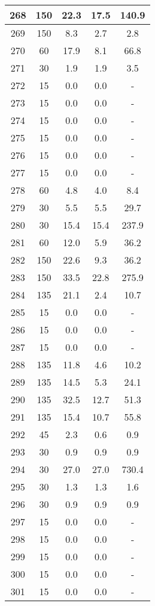 \documentclass[a4paper,10pt]{article}
\begin{document}
\begin{table}
\begin{tabular}{|c|c|c|c|c|}
\hline
268 & 150 & 22.3 & 17.5 & 140.9 \\
\hline
269 & 150 & 8.3 & 2.7 & 2.8 \\
\hline
270 & 60 & 17.9 & 8.1 & 66.8 \\
\hline
271 & 30 & 1.9 & 1.9 & 3.5 \\
\hline
272 & 15 & 0.0 & 0.0 & - \\
\hline
273 & 15 & 0.0 & 0.0 & - \\
\hline
274 & 15 & 0.0 & 0.0 & - \\
\hline
275 & 15 & 0.0 & 0.0 & - \\
\hline
276 & 15 & 0.0 & 0.0 & - \\
\hline
277 & 15 & 0.0 & 0.0 & - \\
\hline
278 & 60 & 4.8 & 4.0 & 8.4 \\
\hline
279 & 30 & 5.5 & 5.5 & 29.7 \\
\hline
280 & 30 & 15.4 & 15.4 & 237.9 \\
\hline
281 & 60 & 12.0 & 5.9 & 36.2 \\
\hline
282 & 150 & 22.6 & 9.3 & 36.2 \\
\hline
283 & 150 & 33.5 & 22.8 & 275.9 \\
\hline
284 & 135 & 21.1 & 2.4 & 10.7 \\
\hline
285 & 15 & 0.0 & 0.0 & - \\
\hline
286 & 15 & 0.0 & 0.0 & - \\
\hline
287 & 15 & 0.0 & 0.0 & - \\
\hline
288 & 135 & 11.8 & 4.6 & 10.2 \\
\hline
289 & 135 & 14.5 & 5.3 & 24.1 \\
\hline
290 & 135 & 32.5 & 12.7 & 51.3 \\
\hline
291 & 135 & 15.4 & 10.7 & 55.8 \\
\hline
292 & 45 & 2.3 & 0.6 & 0.9 \\
\hline
293 & 30 & 0.9 & 0.9 & 0.9 \\
\hline
294 & 30 & 27.0 & 27.0 & 730.4 \\
\hline
295 & 30 & 1.3 & 1.3 & 1.6 \\
\hline
296 & 30 & 0.9 & 0.9 & 0.9 \\
\hline
297 & 15 & 0.0 & 0.0 & - \\
\hline
298 & 15 & 0.0 & 0.0 & - \\
\hline
299 & 15 & 0.0 & 0.0 & - \\
\hline
300 & 15 & 0.0 & 0.0 & - \\
\hline
301 & 15 & 0.0 & 0.0 & - \\

\end{tabular}
\end{table}
\end{document}
